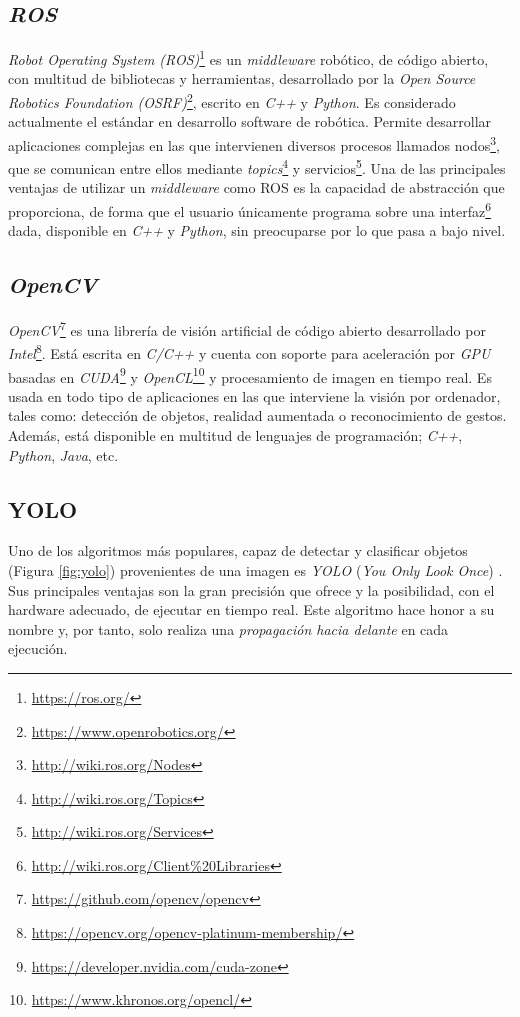 \subsection{\textit{ROS}}
\label{subsection:ros}
\textit{Robot Operating System (ROS)}\footnote{\url{https://ros.org/}} es un \textit{middleware} robótico, de código abierto, con multitud de bibliotecas y herramientas, desarrollado por la \textit{Open Source Robotics Foundation (OSRF)}\footnote{\url{https://www.openrobotics.org/}}, escrito en \textit{C++} y \textit{Python}. Es considerado actualmente el estándar en desarrollo software de robótica. Permite desarrollar aplicaciones complejas en las que intervienen diversos procesos llamados nodos\footnote{\url{http://wiki.ros.org/Nodes}}, que se comunican entre ellos mediante \textit{topics}\footnote{\url{http://wiki.ros.org/Topics}} y servicios\footnote{\url{http://wiki.ros.org/Services}}. Una de las principales ventajas de utilizar un \textit{middleware} como ROS es la capacidad de abstracción que proporciona, de forma que el usuario únicamente programa sobre una interfaz\footnote{\url{http://wiki.ros.org/Client\%20Libraries}} dada, disponible en \textit{C++} y \textit{Python}, sin preocuparse por lo que pasa a bajo nivel.\\

\subsection{\textit{OpenCV}}
\label{subsection:opencv}
\textit{OpenCV}\footnote{\url{https://github.com/opencv/opencv}} es una librería de visión artificial de código abierto desarrollado por \textit{Intel}\footnote{\url{https://opencv.org/opencv-platinum-membership/}}. Está escrita en \textit{C/C++} y cuenta con soporte para aceleración por \textit{GPU} basadas en \textit{CUDA}\footnote{\url{https://developer.nvidia.com/cuda-zone}} y \textit{OpenCL}\footnote{\url{https://www.khronos.org/opencl/}} y procesamiento de imagen en tiempo real. Es usada en todo tipo de aplicaciones en las que interviene la visión por ordenador, tales como: detección de objetos, realidad aumentada o reconocimiento de gestos. Además, está disponible en multitud de lenguajes de programación; \textit{C++}, \textit{Python}, \textit{Java}, etc.\\

\subsection{YOLO}
\label{sec:yolo}
Uno de los algoritmos más populares, capaz de detectar y clasificar objetos (Figura \ref{fig:yolo}) provenientes de una imagen es \textit{YOLO} (\textit{You Only Look Once}) \cite{yolov3}. Sus principales ventajas son la gran precisión que ofrece y la posibilidad, con el hardware adecuado, de ejecutar en tiempo real. Este algoritmo hace honor a su nombre y, por tanto, solo realiza una \textit{propagación hacia delante} en cada ejecución.\\


